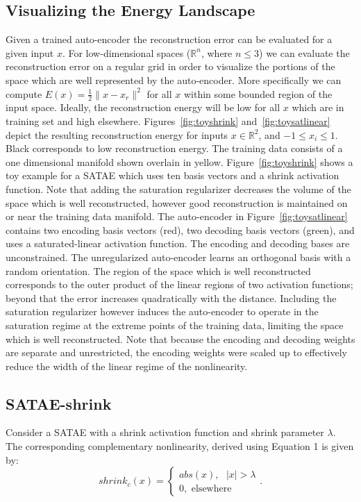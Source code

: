 \documentclass{article} %
\begin{document}
\subsection{Visualizing the Energy Landscape}  
Given a trained auto-encoder the reconstruction error can be evaluated for a given input $x$. For low-dimensional spaces ($\mathbb{R}^n$, where $n \leq 3$) we can evaluate the reconstruction error on a regular grid in order to visualize the portions of the space which are well represented by the auto-encoder. More specifically we can compute $E(x) = \frac{1}{2} \|x - x_r \|^2$ for all $x$ within some bounded region of the input space. Ideally, the reconstruction energy will be low for all $x$ which are in training set and high elsewhere. Figures~\ref{fig:toyshrink} and~\ref{fig:toysatlinear} depict the resulting reconstruction energy for inputs $x \in \mathbb{R}^2$, and  $-1 \leq x_i \leq 1$. Black corresponds to low reconstruction energy. The training data consists of a one dimensional manifold shown overlain in yellow. Figure~\ref{fig:toyshrink} shows a toy example for a SATAE which uses ten basis vectors and a shrink activation function. Note that adding the saturation regularizer decreases the volume of the space which is well reconstructed, however good reconstruction is maintained on or near the training data manifold. The auto-encoder in Figure~\ref{fig:toysatlinear} contains two encoding basis vectors (red), two decoding basis vectors (green), and uses a saturated-linear activation function. The encoding and decoding bases are unconstrained. The unregularized auto-encoder learns an orthogonal basis with a random orientation. The region of the space which is well reconstructed corresponds to the outer product of the linear regions of two activation functions; beyond that the error increases quadratically with the distance. Including the saturation regularizer however induces the auto-encoder to operate in the saturation regime at the extreme points of the training data, limiting the space which is well reconstructed. Note that because the encoding and decoding weights are separate and unrestricted, the encoding weights were scaled up to effectively reduce the width of the linear regime of the nonlinearity. 

\subsection{SATAE-shrink}
Consider a SATAE with a shrink activation function and shrink parameter $\lambda$. The corresponding complementary nonlinearity, derived using Equation 1 is given by: 
\begin{equation} 
\nonumber
shrink_c(x) =
\begin{cases}
abs(x), \text{ } |x| > \lambda\\
0, \text{ elsewhere}
\end{cases}.
\end{equation} 
\end{document}
